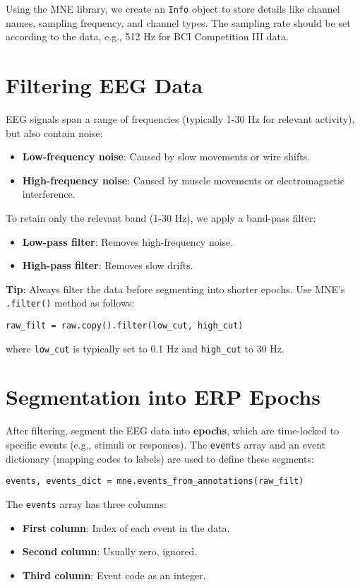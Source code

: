 \documentclass{article}
\begin{document}
Using the MNE library, we create an \texttt{Info} object to store details like channel names, sampling frequency, and channel types. The sampling rate should be set according to the data, e.g., 512 Hz for BCI Competition III data.

\section{Filtering EEG Data}
EEG signals span a range of frequencies (typically 1-30 Hz for relevant activity), but also contain noise:
\begin{itemize}
    \item \textbf{Low-frequency noise}: Caused by slow movements or wire shifts.
    \item \textbf{High-frequency noise}: Caused by muscle movements or electromagnetic interference.
\end{itemize}

To retain only the relevant band (1-30 Hz), we apply a band-pass filter:
\begin{itemize}
    \item \textbf{Low-pass filter}: Removes high-frequency noise.
    \item \textbf{High-pass filter}: Removes slow drifts.
\end{itemize}

\textbf{Tip}: Always filter the data before segmenting into shorter epochs. Use MNE’s \texttt{.filter()} method as follows:
\begin{verbatim}
raw_filt = raw.copy().filter(low_cut, high_cut)
\end{verbatim}
where \texttt{low\_cut} is typically set to 0.1 Hz and \texttt{high\_cut} to 30 Hz.

\section{Segmentation into ERP Epochs}
After filtering, segment the EEG data into \textbf{epochs}, which are time-locked to specific events (e.g., stimuli or responses). The \texttt{events} array and an event dictionary (mapping codes to labels) are used to define these segments:
\begin{verbatim}
events, events_dict = mne.events_from_annotations(raw_filt)
\end{verbatim}
The \texttt{events} array has three columns: 
\begin{itemize}
    \item \textbf{First column}: Index of each event in the data.
    \item \textbf{Second column}: Usually zero, ignored.
    \item \textbf{Third column}: Event code as an integer.
\end{itemize}
\end{document}
